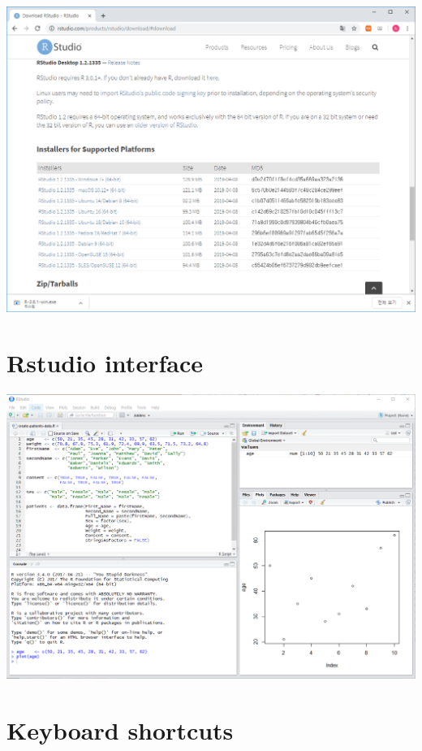 \documentclass[]{book}
\begin{document}
\begin{itemize}
  \includegraphics{images/01-10.PNG}
\end{itemize}

\hypertarget{rstudio-interface}{%
\section{Rstudio interface}\label{rstudio-interface}}

\includegraphics{images/01-11.PNG}

\hypertarget{keyboard-shortcuts}{%
\section{Keyboard shortcuts}\label{keyboard-shortcuts}}
\end{document}
